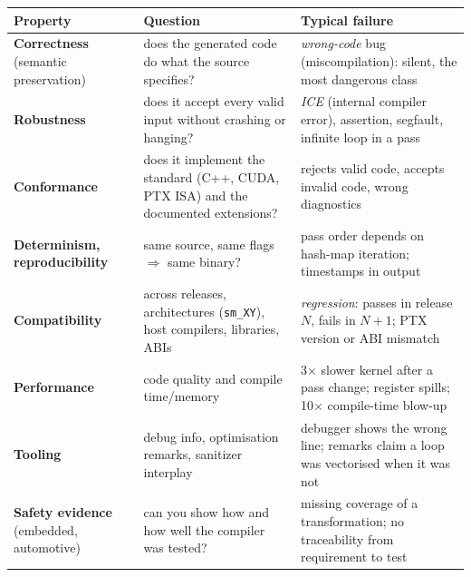 \documentclass[10pt,a4paper,openany,oneside]{report}
\begin{document}
\begin{center}\small
\begin{xltabular}{\textwidth}{@{}L{3.1cm}L{4.9cm}Y@{}}
\toprule
\textbf{Property} & \textbf{Question} & \textbf{Typical failure}\\
\midrule\endhead
\textbf{Correctness} (semantic preservation) & does the generated code do what the source specifies? & \emph{wrong-code} bug (miscompilation): silent, the most dangerous class\\
\textbf{Robustness} & does it accept every valid input without crashing or hanging? & \emph{ICE} (internal compiler error), assertion, segfault, infinite loop in a pass\\
\textbf{Conformance} & does it implement the standard (C++, CUDA, PTX ISA) and the documented extensions? & rejects valid code, accepts invalid code, wrong diagnostics\\
\textbf{Determinism, reproducibility} & same source, same flags $\Rightarrow$ same binary? & pass order depends on hash-map iteration; timestamps in output\\
\textbf{Compatibility} & across releases, architectures (\texttt{sm\_XY}), host compilers, libraries, ABIs & \emph{regression}: passes in release $N$, fails in $N{+}1$; PTX version or ABI mismatch\\
\textbf{Performance} & code quality and compile time/memory & 3$\times$ slower kernel after a pass change; register spills; 10$\times$ compile-time blow-up\\
\textbf{Tooling} & debug info, optimisation remarks, sanitizer interplay & debugger shows the wrong line; remarks claim a loop was vectorised when it was not\\
\textbf{Safety evidence} (embedded, automotive) & can you show how and how well the compiler was tested? & missing coverage of a transformation; no traceability from requirement to test\\
\bottomrule
\end{xltabular}
\end{center}
\end{document}
